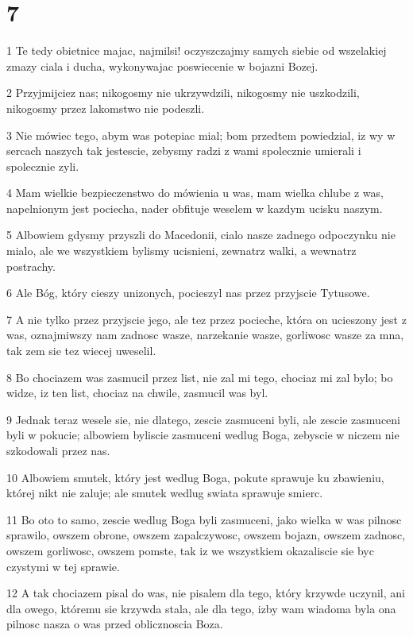 \chapter{7}

\par 1 Te tedy obietnice majac, najmilsi! oczyszczajmy samych siebie od wszelakiej zmazy ciala i ducha, wykonywajac poswiecenie w bojazni Bozej.
\par 2 Przyjmijciez nas; nikogosmy nie ukrzywdzili, nikogosmy nie uszkodzili, nikogosmy przez lakomstwo nie podeszli.
\par 3 Nie mówiec tego, abym was potepiac mial; bom przedtem powiedzial, iz wy w sercach naszych tak jestescie, zebysmy radzi z wami spolecznie umierali i spolecznie zyli.
\par 4 Mam wielkie bezpieczenstwo do mówienia u was, mam wielka chlube z was, napelnionym jest pociecha, nader obfituje weselem w kazdym ucisku naszym.
\par 5 Albowiem gdysmy przyszli do Macedonii, cialo nasze zadnego odpoczynku nie mialo, ale we wszystkiem bylismy ucisnieni, zewnatrz walki, a wewnatrz postrachy.
\par 6 Ale Bóg, który cieszy unizonych, pocieszyl nas przez przyjscie Tytusowe.
\par 7 A nie tylko przez przyjscie jego, ale tez przez pocieche, która on ucieszony jest z was, oznajmiwszy nam zadnosc wasze, narzekanie wasze, gorliwosc wasze za mna, tak zem sie tez wiecej uweselil.
\par 8 Bo chociazem was zasmucil przez list, nie zal mi tego, chociaz mi zal bylo; bo widze, iz ten list, chociaz na chwile, zasmucil was byl.
\par 9 Jednak teraz wesele sie, nie dlatego, zescie zasmuceni byli, ale zescie zasmuceni byli w pokucie; albowiem byliscie zasmuceni wedlug Boga, zebyscie w niczem nie szkodowali przez nas.
\par 10 Albowiem smutek, który jest wedlug Boga, pokute sprawuje ku zbawieniu, której nikt nie zaluje; ale smutek wedlug swiata sprawuje smierc.
\par 11 Bo oto to samo, zescie wedlug Boga byli zasmuceni, jako wielka w was pilnosc sprawilo, owszem obrone, owszem zapalczywosc, owszem bojazn, owszem zadnosc, owszem gorliwosc, owszem pomste, tak iz we wszystkiem okazaliscie sie byc czystymi w tej sprawie.
\par 12 A tak chociazem pisal do was, nie pisalem dla tego, który krzywde uczynil, ani dla owego, któremu sie krzywda stala, ale dla tego, izby wam wiadoma byla ona pilnosc nasza o was przed oblicznoscia Boza.
